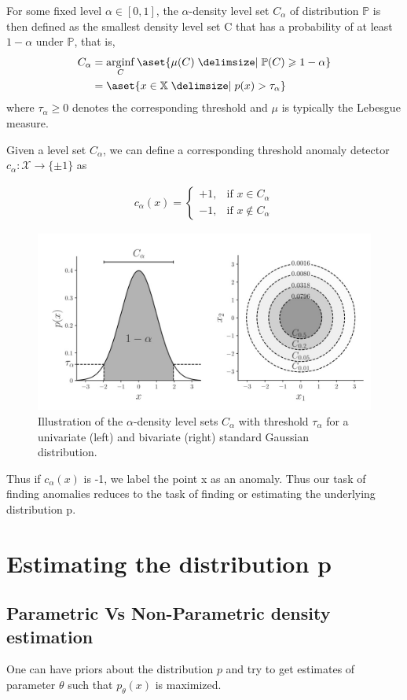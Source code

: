 \documentclass[11pt]{report}
\begin{document}
For some fixed level $\alpha \in [0, 1]$, the $\alpha$-density level set $C_\alpha$ of
distribution $\mathbb{P}$ is then defined as the smallest density level
set C that has a probability of at least $1 - \alpha$ under $\mathbb{P}$, that is,
\begin{align}
    C_\alpha &= \mathop{\arg\!\inf}_{C} \aset{\mu(C) \suchthat \mathbb{P}(C) \geq 1 - \alpha} \nonumber\\
     &= \aset{x \in \mathbb{X} \suchthat p(x) > \tau_\alpha}
\end{align}
where $\tau_\alpha \geq 0$ denotes the corresponding threshold and
$\mu$ is typically the Lebesgue measure.

Given a level set \( C_\alpha \), we can define a corresponding
threshold anomaly detector \( c_\alpha : \mathcal{X} \rightarrow \{ \pm 1 \} \) as

\begin{align}
    c_\alpha(x) =
    \begin{cases}
    +1, & \text{if } x \in C_\alpha \\
    -1, & \text{if } x \notin C_\alpha
    \end{cases}
\end{align}
\begin{figure}
    \centering
    \includegraphics[width=0.5\linewidth]{images/levelset.jpeg}
    \caption{Illustration of the $\alpha$-density level sets $C_\alpha$ with threshold
$\tau_\alpha$ for a univariate (left) and bivariate (right) standard Gaussian
distribution. \cite{ruff2020unifying}}
    \label{fig:placeholder}
\end{figure}

Thus if $c_\alpha(x)$ is -1, we label the point x as an anomaly. Thus our task of finding anomalies reduces to the task of finding or estimating the underlying distribution p.

\section{Estimating the distribution p}
\subsection{Parametric Vs Non-Parametric density estimation} One can have priors about the distribution $p$ and try to get estimates of parameter $\theta$ such that $p_\theta(x)$ is maximized.
\end{document}
